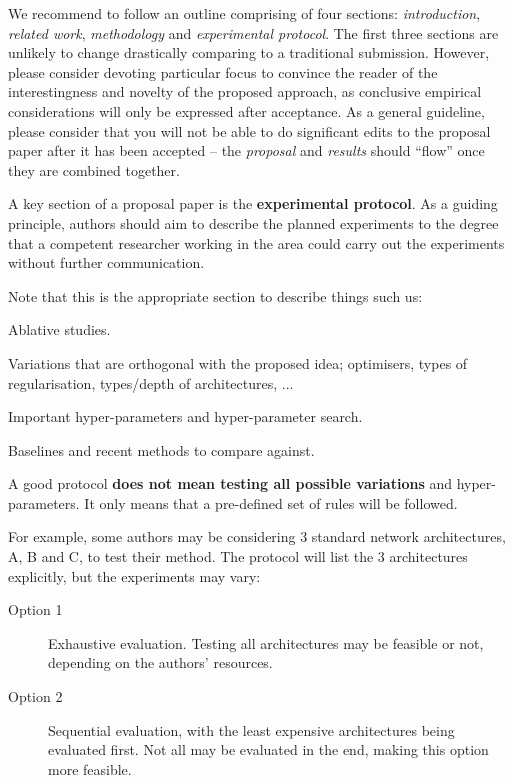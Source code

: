 \documentclass{article}
\begin{document}
We recommend to follow an outline comprising of four sections: \emph{introduction}, \emph{related work}, \emph{methodology} and \emph{experimental protocol}.
The first three sections are unlikely to change drastically comparing to a traditional submission.
However, please consider devoting particular focus to convince the reader of the interestingness and novelty of the proposed approach, as conclusive empirical considerations will only be expressed after acceptance.
As a general guideline, please consider that you will not be able to do significant edits to the proposal paper after it has been accepted -- the \emph{proposal} and \emph{results} should ``flow'' once they are combined together.


A key section of a proposal paper is the \textbf{experimental protocol}.
As a guiding principle, authors should aim to describe the planned experiments to the degree that a competent researcher working in the area could carry out the experiments without further communication.

Note that this is the appropriate section to describe things such us:
\begin{tight_it}
\item Ablative studies.
\item Variations that are orthogonal with the proposed idea; optimisers, types of regularisation, types/depth of architectures, ...
\item Important hyper-parameters and hyper-parameter search.
\item Baselines and recent methods to compare against.
\end{tight_it}

A good protocol {\bf does not mean testing all possible variations} and hyper-parameters.
It only means that a pre-defined set of rules will be followed.

For example, some authors may be considering 3 standard network architectures, A, B and C, to test their method. The protocol will list the 3 architectures explicitly, but the experiments may vary:

\begin{description}
\item[Option 1] Exhaustive evaluation. Testing all architectures may be feasible or not, depending on the authors' resources.
\item[Option 2] Sequential evaluation, with the least expensive architectures being evaluated first. Not all may be evaluated in the end, making this option more feasible.
\end{description}
\end{document}
